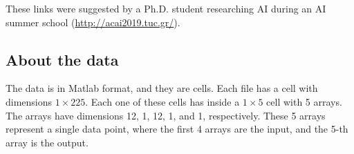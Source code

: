 \documentclass[12pt]{article}
\theoremstyle{definition}
\theoremstyle{remark}
\begin{document}
These links were suggested by a Ph.D. student researching AI during an AI summer school (\url{http://acai2019.tuc.gr/}).

\subsection*{About the data}

The data is in Matlab format, and they are cells. Each file has a cell with dimensions $1\times225$. Each one of these cells has inside a $1\times5$ cell with 5 arrays. The arrays have dimensions 12, 1, 12, 1, and 1, respectively. These 5 arrays represent a single data point, where the first 4 arrays are the input, and the 5-th array is the output.
\end{document}
